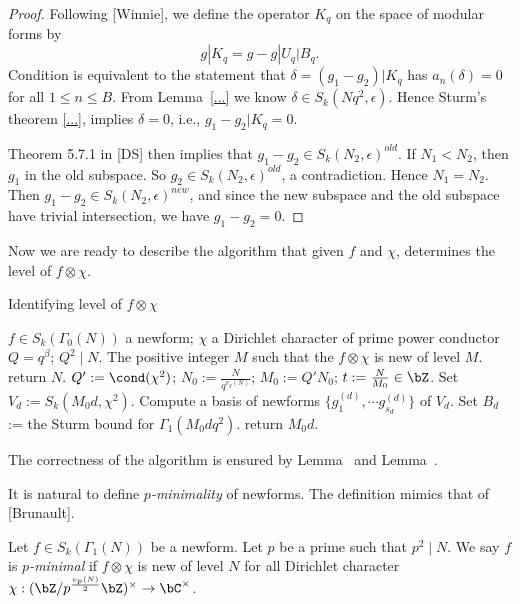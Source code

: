 \documentclass [11pt, proquest] {uwthesis}[2015/03/03]
\begin{document}
\begin{proof}
Following [Winnie], we define the operator $K_q$ on the space of modular forms by
\[
	g|K_q = g - g|U_q|B_q. 
\]
Condition is equivalent to the statement that $\delta  = (g_1 -g_2) |K_q$ has $a_n(\delta) = 0$ for all $1 \leq n \leq B$. 
From Lemma~\ref{...} we know $\delta \in S_k(Nq^2, \epsilon)$. Hence Sturm's theorem \ref{...},  implies $\delta = 0$, i.e., $g_1 - g_2 |K_q = 0$.  

Theorem 5.7.1 in [DS] then implies that $g_1 - g_2 \in S_k(N_2,\epsilon)^{old}$. If $N_1 < N_2$, then $g_1$ in the old subspace. So $g_2 \in S_k(N_2,\epsilon)^{old}$, a contradiction. Hence $N_1 = N_2$. Then $g_1 - g_2 \in S_k(N_2, \epsilon)^{new}$, and since the new subspace and the old subspace have trivial intersection,  we have $g_1 - g_2  = 0$. 
\end{proof}

Now we are ready to describe the algorithm that given $f$ and $\chi$, determines the level of $f \otimes \chi$.

\begin{algorithm}[H]
\caption{Identifying level of $f \otimes \chi$}
\begin{algorithmic}[1]
    \REQUIRE $f \in S_k(\Gamma_0(N))$ a newform; $\chi$ a Dirichlet character of prime power conductor $Q = q^\beta$; $Q^2 \mid N$. 
    \ENSURE The positive integer $M$ such that the $f \otimes \chi$ is new of level $M$. 
    \STATE return $N$.
    \ENDIF
    \STATE $Q' := \cond(\chi^2)$; $N_0 := \frac{N}{q^{v_q(N)}}$; $M_0 := Q'N_0$; $t := \frac{N}{M_0} \in \bZ$. 
    	\STATE Set $V_d := S_k(M_0d, \chi^2)$. 
	\STATE Compute a basis of newforms $\{g_1^{(d)}, \cdots g_{s_d}^{(d)}\}$ of $V_d$.
    	\STATE Set $B_d$ := the Sturm bound for $\Gamma_1(M_0dq^2)$. 
			\STATE return $M_0d$.
		\ENDIF
	\ENDFOR
    \ENDFOR	
\end{algorithmic}
\end{algorithm}

The correctness of the algorithm is ensured by Lemma~ and Lemma~. 

It is natural to define {\it $p$-minimality} of newforms. The definition mimics that of [Brunault]. 

\begin{Definition}
Let $f \in S_k(\Gamma_1(N))$ be a newform. Let $p$ be a prime such that $p^2 \mid N$. 
We say $f$ is {\it $p$-minimal} if $f \otimes \chi$ is new of level $N$ for all Dirichlet character 
$\chi: (\bZ/p^{\frac{v_p(N)}{2}}\bZ)^{\times} \to \bC^{\times}$.
\end{Definition}
\end{document}
